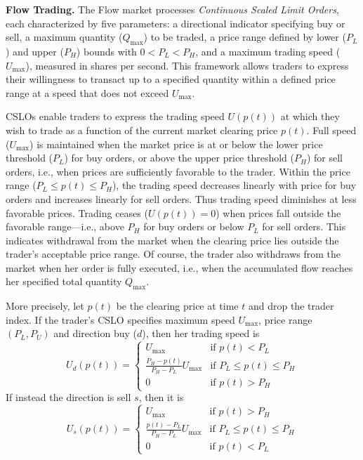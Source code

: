  \bigskip
\noindent
\textbf{Flow Trading.}
The Flow market processes  \textit{Continuous Scaled Limit Orders}, %
each characterized by five parameters: a directional indicator specifying buy or sell, a maximum quantity (\(Q_{\max}\)) to be traded, a price range defined by lower (\(P_L\)) and upper (\(P_H\)) bounds with \(0<P_L < P_H\), and a maximum trading speed (\(U_{\max}\)), measured in shares per second. This framework allows traders to express their willingness to transact up to a specified quantity within a defined price range at a speed that does not exceed \(U_{\max}\).

CSLOs enable traders to express the trading speed \(U(p(t))\) at which they wish to trade as a function of the current market clearing price \(p(t)\). 
Full speed (\(U_{\max}\)) is maintained when the market price is at or below the lower price threshold (\(P_L\)) for buy orders, or above the upper price threshold (\(P_H\)) for sell orders, i.e., when prices are sufficiently favorable to the trader.
Within the price range (\(P_L \leq p(t) \leq P_H\)), the trading speed decreases linearly with price for buy orders and increases linearly for sell orders. Thus trading speed diminishes at less favorable prices. 
Trading ceases (\(U(p(t)) = 0\)) when prices fall outside the favorable range—i.e., above \(P_H\) for buy orders or below \(P_L\) for sell orders. This indicates withdrawal from the market when the clearing price lies outside the trader's acceptable price range. 
Of course, the trader also withdraws from the market when her order is fully executed, i.e., when the accumulated flow reaches her specified total quantity \(Q_{\max}\).

More precisely, let $p(t)$ be the clearing price at time $t$ and drop the trader index. If the trader's CSLO specifies maximum speed $U_{\max}$, price range $(P_L , P_U)$ and direction buy ($d$), then her trading speed is
\begin{equation}\label{eq:flowd}
U_{d}(p(t)) = \begin{cases}
U_{\max} & \text{if } p(t) < P_L \\
\frac{P_H - p(t)}{P_H - P_L} U_{\max} & \text{if } P_L \leq p(t) \leq P_H \\
0 & \text{if } p(t) > P_H
\end{cases}
\end{equation}
If instead the direction is sell $s$,
then it is
\begin{equation}\label{eq:flows}
U_s(p(t)) = \begin{cases}
	U_{\max} & \text{if } p(t) > P_H\\
	\frac{p(t) - P_L}{P_H - P_L} U_{\max} & \text{if } P_L \leq p(t) \leq P_H \\
	0 & \text{if } p(t) < P_L 
\end{cases}
\end{equation}

